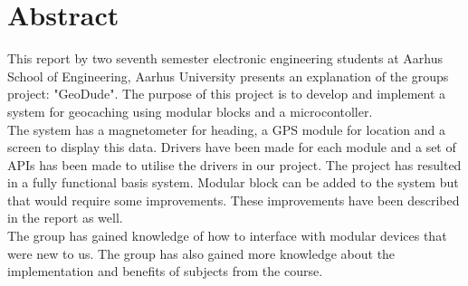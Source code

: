 \chapter{Abstract}
This report by two seventh semester electronic engineering students at Aarhus School of Engineering, Aarhus University presents an explanation of the groups project: "GeoDude". The purpose of this project is to develop and implement a system for geocaching using modular blocks and a microcontoller.\\
The system has a magnetometer for heading, a GPS module for location and a screen to display this data. Drivers have been made for each module and a set of APIs has been made to utilise the drivers in our project. The project has resulted in a fully functional basis system. Modular block can be added to the system but that would require some improvements. These improvements have been described in the report as well.\\
The group has gained knowledge of how to interface with modular devices that were new to us. The group has also gained more knowledge about the implementation and benefits of subjects from the course.

